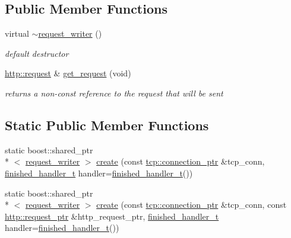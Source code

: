 \subsection*{Public Member Functions}
\begin{DoxyCompactItemize}
\item 
virtual \hyperlink{classpion_1_1http_1_1request__writer_a4e864e362bfa9d132175f80503b32782}{$\sim$request\-\_\-writer} ()
\begin{DoxyCompactList}\small\item\em default destructor \end{DoxyCompactList}\item 
\hyperlink{classpion_1_1http_1_1request}{http\-::request} \& \hyperlink{classpion_1_1http_1_1request__writer_a16c7f5af36362dbb360fc46fd591c2b2}{get\-\_\-request} (void)
\begin{DoxyCompactList}\small\item\em returns a non-\/const reference to the request that will be sent \end{DoxyCompactList}\end{DoxyCompactItemize}
\subsection*{Static Public Member Functions}
\begin{DoxyCompactItemize}
\item 
static boost\-::shared\-\_\-ptr\\*
$<$ \hyperlink{classpion_1_1http_1_1request__writer}{request\-\_\-writer} $>$ \hyperlink{classpion_1_1http_1_1request__writer_a93ea6feb07fbe9a639f6612bf5fe13da}{create} (const \hyperlink{namespacepion_1_1tcp_a6c9b7497068009f6d81d95ec0b0627d6}{tcp\-::connection\-\_\-ptr} \&tcp\-\_\-conn, \hyperlink{classpion_1_1http_1_1writer_a7e3ce4b88e0427adf673a99fca3af982}{finished\-\_\-handler\-\_\-t} handler=\hyperlink{classpion_1_1http_1_1writer_a7e3ce4b88e0427adf673a99fca3af982}{finished\-\_\-handler\-\_\-t}())
\item 
static boost\-::shared\-\_\-ptr\\*
$<$ \hyperlink{classpion_1_1http_1_1request__writer}{request\-\_\-writer} $>$ \hyperlink{classpion_1_1http_1_1request__writer_a00ad93f68c6fe3f8c1087a3d0b4b6242}{create} (const \hyperlink{namespacepion_1_1tcp_a6c9b7497068009f6d81d95ec0b0627d6}{tcp\-::connection\-\_\-ptr} \&tcp\-\_\-conn, const \hyperlink{namespacepion_1_1http_ace432b70a9459d50ff4969a7a47f0ccb}{http\-::request\-\_\-ptr} \&http\-\_\-request\-\_\-ptr, \hyperlink{classpion_1_1http_1_1writer_a7e3ce4b88e0427adf673a99fca3af982}{finished\-\_\-handler\-\_\-t} handler=\hyperlink{classpion_1_1http_1_1writer_a7e3ce4b88e0427adf673a99fca3af982}{finished\-\_\-handler\-\_\-t}())
\end{DoxyCompactItemize}
